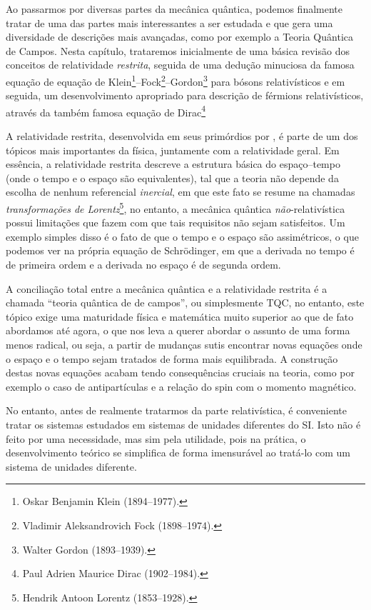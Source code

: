 Ao passarmos por diversas partes da mecânica quântica, podemos finalmente tratar de uma das partes mais interessantes a ser estudada e que gera uma diversidade de descrições mais avançadas, como por exemplo a Teoria Quântica de Campos. Nesta capítulo, trataremos inicialmente de uma básica revisão dos conceitos de relatividade \textit{restrita}, seguida de uma dedução minuciosa da famosa equação de equação de Klein\footnote{Oskar Benjamin Klein (1894--1977).}--Fock\footnote{Vladimir Aleksandrovich Fock (1898--1974).}--Gordon\footnote{Walter Gordon (1893--1939).} para bósons relativísticos e em seguida, um desenvolvimento apropriado para descrição de férmions relativísticos, através da também famosa equação de Dirac\footnote{Paul Adrien Maurice Dirac (1902--1984).}

A relatividade restrita, desenvolvida em seus primórdios por \textcite{Einstein1}, é parte de um dos tópicos mais importantes da física, juntamente com a relatividade geral. Em essência, a relatividade restrita descreve a estrutura básica do espaço--tempo (onde o tempo e o espaço são equivalentes), tal que a teoria não depende da escolha de nenhum referencial \textit{inercial}, em que este fato se resume na chamadas \textit{transformações de Lorentz}\footnote{Hendrik Antoon Lorentz (1853--1928).}, no entanto, a mecânica quântica \textit{não}-relativística possui limitações que fazem com que tais requisitos não sejam satisfeitos. Um exemplo simples disso é o fato de que o tempo e o espaço são assimétricos, o que podemos ver na própria equação de Schrödinger, em que a derivada no tempo é de primeira ordem e a derivada no espaço é de segunda ordem.

A conciliação total entre a mecânica quântica e a relatividade restrita é a chamada ``teoria quântica de de campos'', ou simplesmente TQC, no entanto, este tópico exige uma maturidade física e matemática muito superior ao que de fato abordamos até agora, o que nos leva a querer abordar o assunto de uma forma menos radical, ou seja, a partir de mudanças sutis encontrar novas equações onde o espaço e o tempo sejam tratados de forma mais equilibrada. A construção destas novas equações acabam tendo consequências cruciais na teoria, como por exemplo o caso de antipartículas e a relação do spin com o momento magnético.

No entanto, antes de realmente tratarmos da parte relativística, é conveniente tratar os sistemas estudados em sistemas de unidades diferentes do SI. Isto não é feito por uma necessidade, mas sim pela utilidade, pois na prática, o desenvolvimento teórico se simplifica de forma imensurável ao tratá-lo com um sistema de unidades diferente.